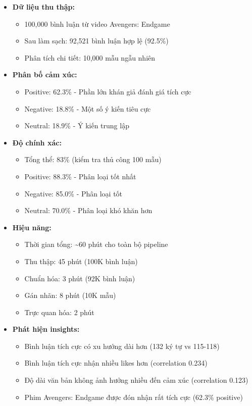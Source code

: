 \begin{itemize}
    \item \textbf{Dữ liệu thu thập:}
    \begin{itemize}
        \item 100,000 bình luận từ video Avengers: Endgame
        \item Sau làm sạch: 92,521 bình luận hợp lệ (92.5\%)
        \item Phân tích chi tiết: 10,000 mẫu ngẫu nhiên
    \end{itemize}
    
    \item \textbf{Phân bố cảm xúc:}
    \begin{itemize}
        \item Positive: 62.3\% - Phần lớn khán giả đánh giá tích cực
        \item Negative: 18.8\% - Một số ý kiến tiêu cực
        \item Neutral: 18.9\% - Ý kiến trung lập
    \end{itemize}
    
    \item \textbf{Độ chính xác:}
    \begin{itemize}
        \item Tổng thể: 83\% (kiểm tra thủ công 100 mẫu)
        \item Positive: 88.3\% - Phân loại tốt nhất
        \item Negative: 85.0\% - Phân loại tốt
        \item Neutral: 70.0\% - Phân loại khó khăn hơn
    \end{itemize}
    
    \item \textbf{Hiệu năng:}
    \begin{itemize}
        \item Thời gian tổng: \textasciitilde 60 phút cho toàn bộ pipeline
        \item Thu thập: 45 phút (100K bình luận)
        \item Chuẩn hóa: 3 phút (92K bình luận)
        \item Gán nhãn: 8 phút (10K mẫu)
        \item Trực quan hóa: 2 phút
    \end{itemize}
    
    \item \textbf{Phát hiện insights:}
    \begin{itemize}
        \item Bình luận tích cực có xu hướng dài hơn (132 ký tự vs 115-118)
        \item Bình luận tích cực nhận nhiều likes hơn (correlation 0.234)
        \item Độ dài văn bản không ảnh hưởng nhiều đến cảm xúc (correlation 0.123)
        \item Phim Avengers: Endgame được đón nhận rất tích cực (62.3\% positive)
    \end{itemize}
\end{itemize}

